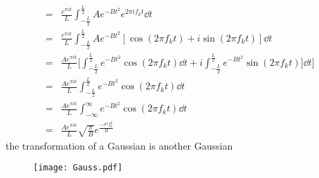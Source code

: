 \documentclass{article}
\begin{document}
\begin{enumerate}
\begin{enumerate}
\begin{align}
				=& \frac{e^{\pi i k}}{L} \int_{-\frac{L}{2}}^{\frac{L}{2}} A e^{-Bt^2} e^{2 \pi i f_k t} \dd{t} \\
				=& \frac{e^{\pi i k}}{L} \int_{-\frac{L}{2}}^{\frac{L}{2}} A e^{-Bt^2} [\cos (2 \pi f_k t) + i \sin (2 \pi f_k t)] \dd{t} \\
				=& \frac{A e^{\pi i k}}{L} \bigg[ \int_{-\frac{L}{2}}^{\frac{L}{2}} e^{-Bt^2} \cos (2 \pi f_k t) \dd{t} + i \int_{-\frac{L}{2}}^{\frac{L}{2}} e^{-Bt^2} \sin (2 \pi f_k t)] \dd{t} \bigg] \\
				=& \frac{A e^{\pi i k}}{L} \int_{-\frac{L}{2}}^{\frac{L}{2}} e^{-Bt^2} \cos (2 \pi f_k t) \dd{t} \\
				=& \frac{A e^{\pi i k}}{L} \int_{-\infty}^{\infty} e^{-Bt^2} \cos (2 \pi f_k t) \dd{t} \\
				=& \frac{A e^{\pi i k}}{L} \sqrt{\frac{\pi}{B}} e^{\frac{-\pi^2 f_k^2}{B}} 
			\end{align}
			the transformation of a Gaussian is another Gaussian
			\begin{figure}[ht]
			\texttt{[image: Gauss.pdf]}
			\end{figure}
		\end{enumerate}
	
\end{enumerate}
\end{document}
